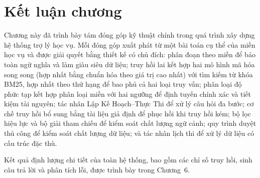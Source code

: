 \documentclass[../DoAn.tex]{subfiles}
\begin{document}
\section{Kết luận chương}

Chương này đã trình bày tám đóng góp kỹ thuật chính trong quá trình xây dựng
hệ thống trợ lý học vụ. Mỗi đóng góp xuất phát từ một bài toán cụ thể của miền
học vụ và được giải quyết bằng thiết kế có chủ đích: phân đoạn theo miền để bảo
toàn ngữ nghĩa và làm giàu siêu dữ liệu; truy hồi lai kết hợp hai mô hình mã
hóa song song (hợp nhất bằng chuẩn hóa theo giá trị cao nhất) với tìm kiếm từ
khóa BM25, hợp nhất theo thứ hạng để bao phủ cả hai loại truy vấn;
phân loại độ phức tạp kết hợp phân loại miền với hai ngưỡng để định tuyến chính
xác và tiết kiệm tài nguyên; tác nhân Lập Kế Hoạch--Thực Thi để xử lý câu hỏi
đa bước; cơ chế truy hồi bổ sung bằng tài liệu giả định để phục hồi khi truy
hồi kém; bộ lọc hiệu lực và bộ giải tham chiếu để kiểm soát chất lượng ngữ
cảnh; quy trình duyệt thủ công để kiểm soát chất lượng dữ liệu; và tác nhân
lịch thi để xử lý dữ liệu có cấu trúc đặc thù.

Kết quả định lượng chi tiết của toàn hệ thống, bao gồm các chỉ số truy hồi, sinh
câu trả lời và phân tích lỗi, được trình bày trong Chương~6.
\end{document}
